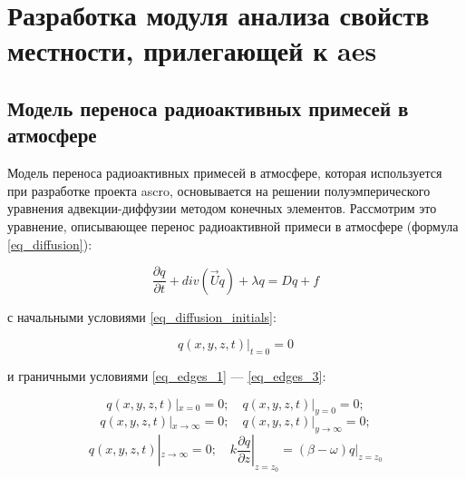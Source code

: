 \chapter{Разработка модуля анализа свойств местности, прилегающей к \ac{aes}}
\label{chapter_surf_type}

\section{Модель переноса радиоактивных примесей в атмосфере} 
\label{diffusion_model}

Модель переноса радиоактивных примесей в атмосфере, которая используется при разработке проекта \ac{ascro}, основывается 
на решении полуэмперического уравнения адвекции-диффузии \cite{elokhin} методом конечных элементов. Рассмотрим это 
уравнение, описывающее перенос радиоактивной примеси в атмосфере (формула \ref{eq_diffusion}): 

\begin{equation}
    \label{eq_diffusion}
    \frac{\partial q}{\partial t} + div(\vec{U}q) + \lambda q = Dq + f
\end{equation}

с начальными условиями \ref{eq_diffusion_initials}:

\begin{equation}
	\label{eq_diffusion_initials}
    q(x, y, z, t)|_{t=0} = 0
\end{equation}

и граничными условиями \ref{eq_edges_1} --- \ref{eq_edges_3}:

\begin{equation}
	\label{eq_edges_1}
	q(x, y, z, t)|_{x=0}=0; \,\,\,\,\,\,  q(x, y, z, t)|_{y=0}=0;
\end{equation}
\begin{equation}
	\label{eq_edges_2}
	q(x, y, z, t)|_{x \rightarrow \infty}=0; \,\,\,\,\,\,  q(x, y, z, t)|_{y \rightarrow \infty}=0;
\end{equation}
\begin{equation}
	\label{eq_edges_3}
	q(x, y, z, t)|_{z \rightarrow \infty}=0; \,\,\,\,\,\, 
	k\frac{\partial q}{\partial z}|_{z=z_{0}} = (\beta - \omega)q|_{z=z_{0}}
\end{equation}

